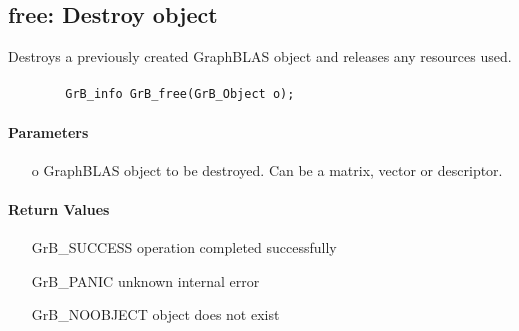 \subsection{{\sf free}: Destroy object}

Destroys a previously created GraphBLAS object and releases any resources used.

\paragraph{\syntax}

\begin{verbatim}
        GrB_info GrB_free(GrB_Object o);
\end{verbatim}


\paragraph{Parameters}

\begin{itemize}[leftmargin=1.1in]
	\item[{\sf o}] GraphBLAS object to be destroyed. Can be a matrix, vector or descriptor.
\end{itemize}

\paragraph{Return Values}

\begin{itemize}[leftmargin=2.1in]
\item[{\sf GrB\_SUCCESS}]        operation completed successfully
\item[{\sf GrB\_PANIC}]          unknown internal error
\item[{\sf GrB\_NOOBJECT}]       object does not exist
\end{itemize}

